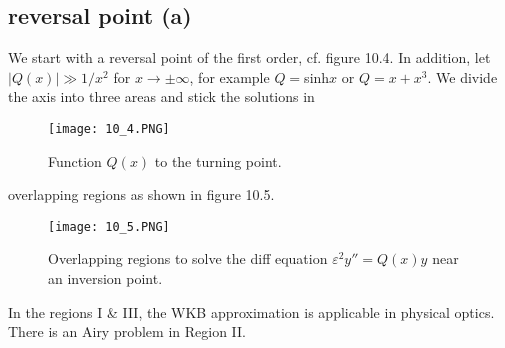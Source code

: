 \subsection{reversal point (a)}
We start with a reversal point of the first order, cf. figure 10.4. In addition, let $| Q (x) | \gg 1 / x^2$ for $x \rightarrow\pm\infty$, for example $Q = $sinh$ x$ or $Q = x + x^3$. We divide the axis into three areas and stick the solutions in
%
\begin{figure}[ht]
    \begin{minipage}{0.5\textwidth}
        \centering
        \texttt{[image: 10\_4.PNG]}
    \end{minipage}
    \begin{minipage}{0.5\textwidth}
        \caption{Function $Q (x)$ to the turning point.}
    \end{minipage}
\end{figure}
overlapping regions as shown in figure 10.5. \par
\begin{figure}[ht]
        \centering
        \texttt{[image: 10\_5.PNG]}
        \caption{Overlapping regions to solve the diff equation $\varepsilon^2y''=Q(x)y$ near an inversion point.}
\end{figure}
In the regions I \& III, the WKB approximation is applicable in physical optics. There is an Airy problem in Region II.
